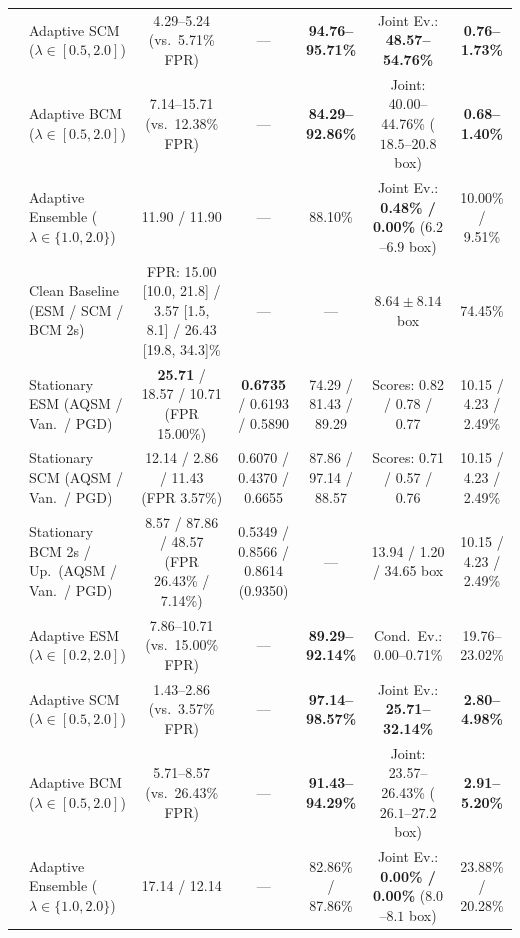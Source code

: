 \documentclass[preprint,10pt]{elsarticle}
\begin{document}
\begin{table}[!htbp]
{{\begin{tabular}{llccccc}
& Adaptive SCM ($\lambda \in [0.5, 2.0]$) & 4.29--5.24 (vs.\ 5.71\% FPR) & --- & \textbf{94.76--95.71\%} & Joint Ev.: \textbf{48.57--54.76\%} & \textbf{0.76--1.73\%} \\
& Adaptive BCM ($\lambda \in [0.5, 2.0]$) & 7.14--15.71 (vs.\ 12.38\% FPR) & --- & \textbf{84.29--92.86\%} & Joint: 40.00--44.76\% ($18.5$--$20.8$ box) & \textbf{0.68--1.40\%} \\
& Adaptive Ensemble ($\lambda \in \{1.0, 2.0\}$) & 11.90 / 11.90 & --- & 88.10\% & Joint Ev.: \textbf{0.48\% / 0.00\%} ($6.2$--$6.9$ box) & 10.00\% / 9.51\% \\
\midrule
{} & Clean Baseline (ESM / SCM / BCM 2s) & FPR: 15.00 [10.0, 21.8] / 3.57 [1.5, 8.1] / 26.43 [19.8, 34.3]\% & --- & --- & $8.64 \pm 8.14$ box & 74.45\% \\
& Stationary ESM (AQSM / Van.\ / PGD) & \textbf{25.71} / 18.57 / 10.71 (FPR 15.00\%) & \textbf{0.6735} / 0.6193 / 0.5890 & 74.29 / 81.43 / 89.29 & Scores: 0.82 / 0.78 / 0.77 & 10.15 / 4.23 / 2.49\% \\
& Stationary SCM (AQSM / Van.\ / PGD) & 12.14 / 2.86 / 11.43 (FPR 3.57\%) & 0.6070 / 0.4370 / 0.6655 & 87.86 / 97.14 / 88.57 & Scores: 0.71 / 0.57 / 0.76 & 10.15 / 4.23 / 2.49\% \\
& Stationary BCM 2s / Up.\ (AQSM / Van.\ / PGD) & 8.57 / 87.86 / 48.57 (FPR 26.43\% / 7.14\%) & 0.5349 / 0.8566 / 0.8614 (0.9350) & --- & 13.94 / 1.20 / 34.65 box & 10.15 / 4.23 / 2.49\% \\
& Adaptive ESM ($\lambda \in [0.2, 2.0]$) & 7.86--10.71 (vs.\ 15.00\% FPR) & --- & \textbf{89.29--92.14\%} & Cond.\ Ev.: 0.00--0.71\% & 19.76--23.02\% \\
& Adaptive SCM ($\lambda \in [0.5, 2.0]$) & 1.43--2.86 (vs.\ 3.57\% FPR) & --- & \textbf{97.14--98.57\%} & Joint Ev.: \textbf{25.71--32.14\%} & \textbf{2.80--4.98\%} \\
& Adaptive BCM ($\lambda \in [0.5, 2.0]$) & 5.71--8.57 (vs.\ 26.43\% FPR) & --- & \textbf{91.43--94.29\%} & Joint: 23.57--26.43\% ($26.1$--$27.2$ box) & \textbf{2.91--5.20\%} \\
& Adaptive Ensemble ($\lambda \in \{1.0, 2.0\}$) & 17.14 / 12.14 & --- & 82.86\% / 87.86\% & Joint Ev.: \textbf{0.00\% / 0.00\%} ($8.0$--$8.1$ box) & 23.88\% / 20.28\% \\
\bottomrule
\end{tabular}%
}}
\end{table}
\end{document}
